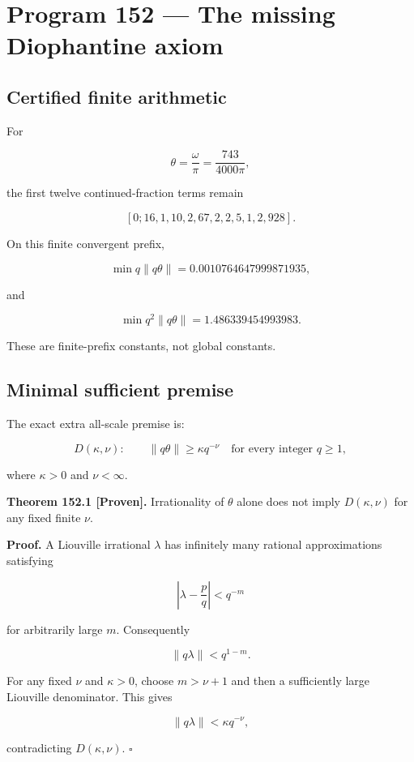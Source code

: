\documentclass[11pt,a4paper,openany]{report}
\newcommand{\statusProven}{\textcolor{fingreen}{[Proven]}}
\begin{document}
\chapter{Program 152 --- The missing Diophantine axiom}

\section{Certified finite arithmetic}

For

\[
\theta=\frac{\omega}{\pi}=\frac{743}{4000\pi},
\]

the first twelve continued-fraction terms remain

\[
[0;16,1,10,2,67,2,2,5,1,2,928].
\]

On this finite convergent prefix,

\[
\min q\|q\theta\|
=0.0010764647999871935,
\]

and

\[
\min q^2\|q\theta\|
=1.486339454993983.
\]

These are finite-prefix constants, not global constants.

\section{Minimal sufficient premise}

The exact extra all-scale premise is:

\[
D(\kappa,\nu):
\qquad
\|q\theta\|\ge\kappa q^{-\nu}
\quad
\text{for every integer }q\ge1,
\]

where \(\kappa>0\) and \(\nu<\infty\).

\textbf{Theorem 152.1 \statusProven{}.} Irrationality of \(\theta\) alone does not imply \(D(\kappa,\nu)\) for any fixed finite \(\nu\).

\textbf{Proof.} A Liouville irrational \(\lambda\) has infinitely many rational approximations satisfying

\[
\left|\lambda-\frac pq\right|<q^{-m}
\]

for arbitrarily large \(m\). Consequently

\[
\|q\lambda\|<q^{1-m}.
\]

For any fixed \(\nu\) and \(\kappa>0\), choose \(m>\nu+1\) and then a sufficiently large Liouville denominator. This gives

\[
\|q\lambda\|<\kappa q^{-\nu},
\]

contradicting \(D(\kappa,\nu)\). \(\square\)
\end{document}
